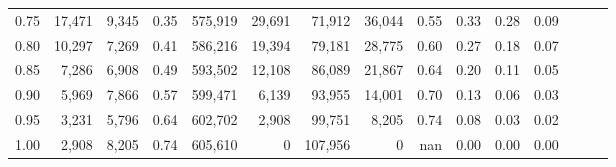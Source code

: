 \begin{tabular}{rrrrrrrrrrrrrrr}
0.75 &  17,471 &  9,345 &  0.35 &  575,919 &   29,691 &   71,912 &   36,044 &  0.55 &  0.33 &  0.28 &      0.09 \\
0.80 &  10,297 &  7,269 &  0.41 &  586,216 &   19,394 &   79,181 &   28,775 &  0.60 &  0.27 &  0.18 &      0.07 \\
0.85 &   7,286 &  6,908 &  0.49 &  593,502 &   12,108 &   86,089 &   21,867 &  0.64 &  0.20 &  0.11 &      0.05 \\
0.90 &   5,969 &  7,866 &  0.57 &  599,471 &    6,139 &   93,955 &   14,001 &  0.70 &  0.13 &  0.06 &      0.03 \\
0.95 &   3,231 &  5,796 &  0.64 &  602,702 &    2,908 &   99,751 &    8,205 &  0.74 &  0.08 &  0.03 &      0.02 \\
1.00 &   2,908 &  8,205 &  0.74 &  605,610 &        0 &  107,956 &        0 &   nan &  0.00 &  0.00 &      0.00 \\
\bottomrule
\end{tabular}
